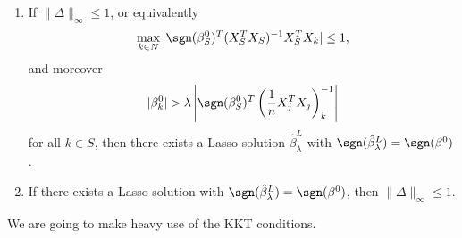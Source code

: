 \documentclass[a4paper]{article}
\begin{document}
\begin{thm}\leavevmode
  \begin{enumerate}
    \item If $\|\Delta\|_\infty \leq 1$, or equivalently
      \[
        \max_{k \in N} |\sgn(\beta^0_S)^T (X^T_S X_S)^{-1} X^T_S X_k| \leq 1,
      \]
      and moreover
      \[
        |\beta^0_k| > \lambda \left|\sgn(\beta^0_S)^T \left(\frac{1}{n} X_j^T X_j\right)^{-1}_k\right|
      \]
      for all $k \in S$, then there exists a Lasso solution $\hat{\beta}^L_\lambda$ with $\sgn(\hat{\beta}_\lambda^L) = \sgn(\beta^0)$.
    \item If there exists a Lasso solution with $\sgn (\hat{\beta}_\lambda^L) = \sgn(\beta^0)$, then $\|\Delta\|_\infty \leq 1$.
  \end{enumerate}
\end{thm}
We are going to make heavy use of the KKT conditions.
\end{document}
